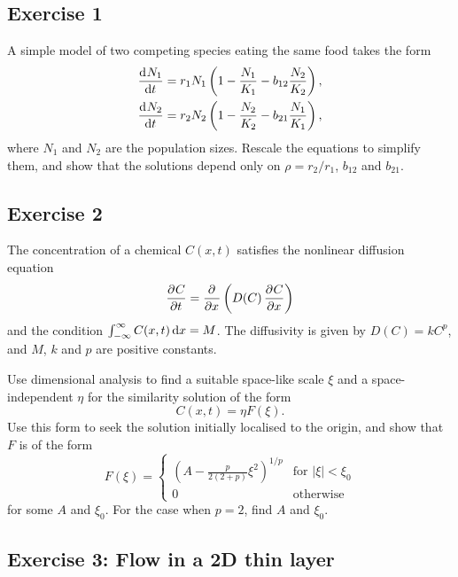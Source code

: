\documentclass{article}
\begin{document}
\subsection{Exercise 1} 

A simple model of two competing species eating the same food takes the form
\begin{align*}
 \dod{N_1}{t} &= r_1 N_1 \left( 1 - \frac{N_1}{K_1} - b_{12} \frac{N_2}{K_2} \right), \\
 \dod{N_2}{t} &= r_2 N_2 \left( 1 - \frac{N_2}{K_2} - b_{21} \frac{N_1}{K_1} \right), \\
\end{align*}
where $N_1$ and $N_2$ are the population sizes. Rescale the equations to
simplify them, and show that the solutions depend only on $\rho = r_2/r_1$,
$b_{12}$ and $b_{21}$. 

\subsection{Exercise 2}


The concentration of a chemical $C(x,t)$ satisfies the nonlinear diffusion
equation
$$ \dpd{C}{t} = \dpd{}{x}\left(D(C)\dpd{C}{x}\right) $$
and the condition $\int_{-\infty}^\infty C(x,t) \dif x = M$. The diffusivity is
given by $D(C) = kC^p$, and $M$, $k$ and $p$ are positive constants. 

Use dimensional analysis to find a suitable space-like scale $\xi$ and a
space-independent $\eta$ for the similarity solution of the form 
$$ C(x,t) = \eta F(\xi). $$
Use this form to seek the solution initially localised to the origin, and show
that $F$ is of the form
$$ F(\xi) = \begin{cases}
 \left( A - \frac{p}{2(2+p)} \xi^2 \right)^{1/p} & \text{for $|\xi| < \xi_0$} \\
 0 & \text{otherwise}
\end{cases} $$
for some $A$ and $\xi_0$. For the case when $p=2$, find $A$ and $\xi_0$. 

\subsection{Exercise 3: Flow in a 2D thin layer}
\end{document}
